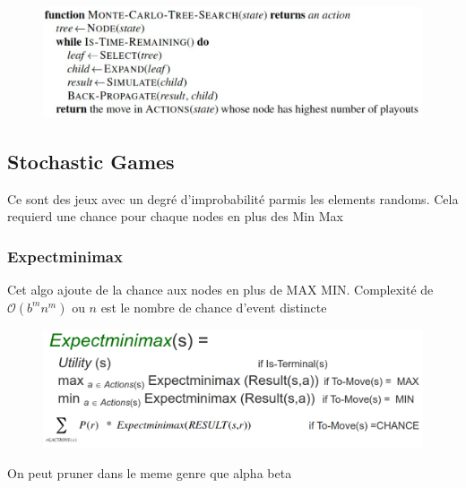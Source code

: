		\begin{figure}[H]
			\centering
			\includegraphics[width=\textwidth]{img/MCTS1.png}
		\end{figure}
	
	\subsection{Stochastic Games}
		Ce sont des jeux avec un degré d'improbabilité parmis les elements randoms. Cela requierd une chance pour chaque nodes en plus des Min Max
		
		
		\subsubsection{Expectminimax}
			Cet algo ajoute de la chance aux nodes en plus de MAX MIN. Complexité de $\mathcal{O}(b^{m}n^{m})$ ou $n$ est le nombre de chance d'event distincte
			
		\begin{figure}[H]
			\centering
			\includegraphics[width=\textwidth]{img/EM.png}
		\end{figure}
		
		On peut pruner dans le meme genre que alpha beta